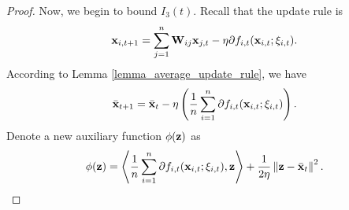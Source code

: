 \documentclass{article}
\begin{document}
\begin{proof}
Now, we begin to bound $I_3(t)$. Recall that the update rule is 
\begin{align}
\nonumber
{\bf x}_{i,t+1} = \sum_{j=1}^n {\bf W}_{ij}{\bf x}_{j,t} - \eta \partial f_{i,t}({\bf x}_{i,t};\xi_{i,t}).
\end{align}  According to Lemma \ref{lemma_average_update_rule}, we have 
\begin{align}
\label{equa_thoerem_update_rule_equivalent}
\bar{{\bf x}}_{t+1} = \bar{{\bf x}}_t - \eta \left( \frac{1}{n}\sum_{i=1}^n \partial f_{i,t}({\bf x}_{i,t};\xi_{i,t}) \right).
\end{align} 
Denote a new auxiliary function $\phi({\bf z})$ as 
\begin{align}
\nonumber
\phi({\bf z}) = \left\langle\frac{1}{n}\sum_{i=1}^n \partial f_{i,t}({\bf x}_{i,t};\xi_{i,t}), {\bf z} \right\rangle + \frac{1}{2\eta}\left\lVert{\bf z} - \bar{{\bf x}}_t\right\rVert^2.
\end{align} 


\end{proof}
\end{document}
